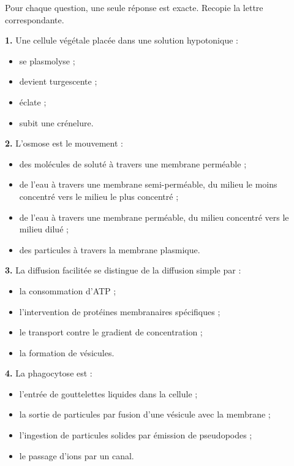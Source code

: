 \documentclass[11pt]{article}
\begin{document}
\begin{exercice}
Pour chaque question, une seule réponse est exacte. Recopie la lettre correspondante.

\textbf{1.} Une cellule végétale placée dans une solution hypotonique :
\begin{itemize}
\item[a)] se plasmolyse ;
\item[b)] devient turgescente ;
\item[c)] éclate ;
\item[d)] subit une crénelure.
\end{itemize}

\textbf{2.} L'osmose est le mouvement :
\begin{itemize}
\item[a)] des molécules de soluté à travers une membrane perméable ;
\item[b)] de l'eau à travers une membrane semi-perméable, du milieu le moins concentré vers le milieu le plus concentré ;
\item[c)] de l'eau à travers une membrane perméable, du milieu concentré vers le milieu dilué ;
\item[d)] des particules à travers la membrane plasmique.
\end{itemize}

\textbf{3.} La diffusion facilitée se distingue de la diffusion simple par :
\begin{itemize}
\item[a)] la consommation d'ATP ;
\item[b)] l'intervention de protéines membranaires spécifiques ;
\item[c)] le transport contre le gradient de concentration ;
\item[d)] la formation de vésicules.
\end{itemize}

\textbf{4.} La phagocytose est :
\begin{itemize}
\item[a)] l'entrée de gouttelettes liquides dans la cellule ;
\item[b)] la sortie de particules par fusion d'une vésicule avec la membrane ;
\item[c)] l'ingestion de particules solides par émission de pseudopodes ;
\item[d)] le passage d'ions par un canal.
\end{itemize}
\end{exercice}
\end{document}
